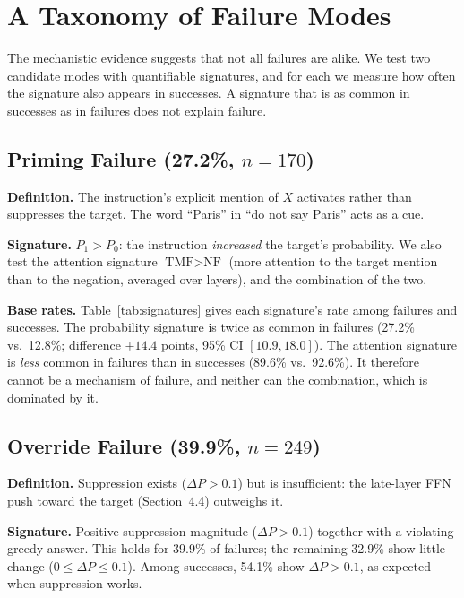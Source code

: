 \documentclass{article}
\begin{document}
\section{A Taxonomy of Failure Modes}
\label{sec:taxonomy}

The mechanistic evidence suggests that not all failures are alike. We test two candidate modes with quantifiable signatures, and for each we measure how often the signature also appears in successes. A signature that is as common in successes as in failures does not explain failure.

\subsection{Priming Failure (27.2\%, $n = 170$)}

\textbf{Definition.} The instruction's explicit mention of $X$ activates rather than suppresses the target. The word ``Paris'' in ``do not say Paris'' acts as a cue.

\textbf{Signature.} $P_1 > P_0$: the instruction \emph{increased} the target's probability. We also test the attention signature $\text{TMF} > \text{NF}$ (more attention to the target mention than to the negation, averaged over layers), and the combination of the two.

\textbf{Base rates.} Table~\ref{tab:signatures} gives each signature's rate among failures and successes. The probability signature is twice as common in failures (27.2\% vs.\ 12.8\%; difference $+14.4$ points, 95\% CI $[10.9, 18.0]$). The attention signature is \emph{less} common in failures than in successes (89.6\% vs.\ 92.6\%). It therefore cannot be a mechanism of failure, and neither can the combination, which is dominated by it.

\subsection{Override Failure (39.9\%, $n = 249$)}

\textbf{Definition.} Suppression exists ($\Delta P > 0.1$) but is insufficient: the late-layer FFN push toward the target (Section~4.4) outweighs it.

\textbf{Signature.} Positive suppression magnitude ($\Delta P > 0.1$) together with a violating greedy answer. This holds for 39.9\% of failures; the remaining 32.9\% show little change ($0 \leq \Delta P \leq 0.1$). Among successes, 54.1\% show $\Delta P > 0.1$, as expected when suppression works.
\end{document}
